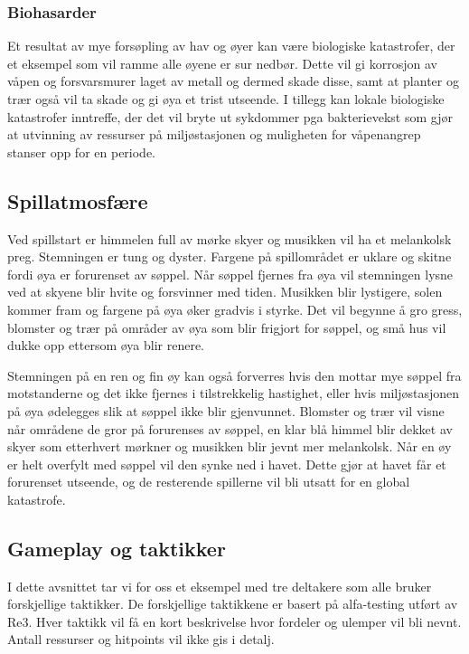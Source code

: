 \subsubsection{Biohasarder}
Et resultat av mye forsøpling av hav og øyer kan være biologiske katastrofer, der et eksempel som vil ramme alle øyene er sur nedbør. Dette vil gi korrosjon av våpen og forsvarsmurer laget av metall og dermed skade disse, samt at planter og trær også vil ta skade og gi øya et trist utseende.
I tillegg kan lokale biologiske katastrofer inntreffe, der det vil bryte ut sykdommer pga bakterievekst som gjør at utvinning av ressurser på miljøstasjonen og muligheten for våpenangrep stanser opp for en periode.


\subsection{Spillatmosfære}

Ved spillstart er himmelen full av mørke skyer og musikken vil ha et melankolsk preg. Stemningen er tung og dyster. Fargene på spillområdet er uklare og skitne fordi øya er forurenset av søppel.
Når søppel fjernes fra øya vil stemningen lysne ved at skyene blir hvite og forsvinner med tiden. Musikken blir lystigere, 
solen kommer fram og fargene på øya øker gradvis i styrke. Det vil begynne å gro gress, blomster og 
trær på områder av øya som blir frigjort for søppel, og små hus vil dukke opp ettersom øya blir renere. 

Stemningen på en ren og fin øy kan også forverres hvis den mottar mye søppel fra motstanderne og det ikke fjernes i tilstrekkelig hastighet,
eller hvis miljøstasjonen på øya ødelegges slik at søppel ikke blir gjenvunnet.
Blomster og trær vil visne når områdene de gror på forurenses av søppel, en klar blå himmel blir dekket av skyer som etterhvert mørkner og
musikken blir jevnt mer melankolsk. 
Når en øy er helt overfylt med søppel vil den synke ned i havet. Dette gjør at havet  får et forurenset utseende,
 og de resterende spillerne vil bli utsatt for en global katastrofe.


\subsection{Gameplay og taktikker}

I dette avsnittet tar vi for oss et eksempel med tre deltakere som alle bruker forskjellige taktikker. De forskjellige taktikkene er basert på alfa-testing utført av Re3. Hver taktikk vil få en kort beskrivelse hvor fordeler og ulemper vil bli nevnt. Antall ressurser og hitpoints vil ikke gis i detalj.

